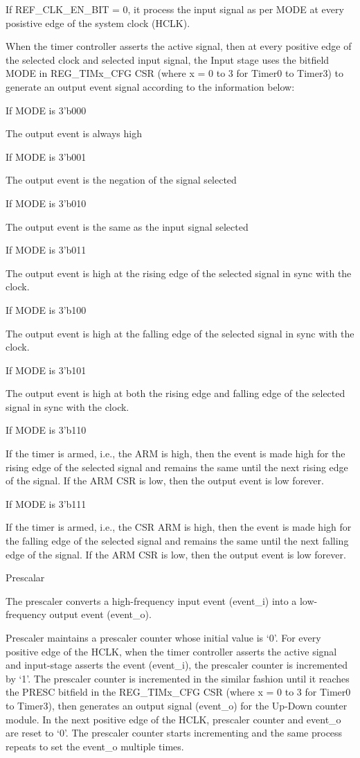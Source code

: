     If REF_CLK_EN_BIT = 0, it process the input signal as per MODE at every posistive edge of the system clock (HCLK).

When the timer controller asserts the active signal, then at every positive edge of the selected clock and selected input signal, the Input stage uses the bitfield MODE in REG_TIMx_CFG CSR (where x = 0 to 3 for Timer0 to Timer3) to generate an output event signal according to the information below:

    If MODE is 3’b000

        The output event is always high

    If MODE is 3’b001

        The output event is the negation of the signal selected

    If MODE is 3’b010

        The output event is the same as the input signal selected

    If MODE is 3’b011

        The output event is high at the rising edge of the selected signal in sync with the clock.

    If MODE is 3’b100

        The output event is high at the falling edge of the selected signal in sync with the clock.

    If MODE is 3’b101

        The output event is high at both the rising edge and falling edge of the selected signal in sync with the clock.

    If MODE is 3’b110

        If the timer is armed, i.e., the ARM is high, then the event is made high for the rising edge of the selected signal and remains the same until the next rising edge of the signal. If the ARM CSR is low, then the output event is low forever.

    If MODE is 3’b111

        If the timer is armed, i.e., the CSR ARM is high, then the event is made high for the falling edge of the selected signal and remains the same until the next falling edge of the signal. If the ARM CSR is low, then the output event is low forever.

Prescalar

The prescaler converts a high-frequency input event (event_i) into a low-frequency output event (event_o).

Prescaler maintains a prescaler counter whose initial value is ‘0’. For every positive edge of the HCLK, when the timer controller asserts the active signal and input-stage asserts the event (event_i), the prescaler counter is incremented by ‘1’. The prescaler counter is incremented in the similar fashion until it reaches the PRESC bitfield in the REG_TIMx_CFG CSR (where x = 0 to 3 for Timer0 to Timer3), then generates an output signal (event_o) for the Up-Down counter module. In the next positive edge of the HCLK, prescaler counter and event_o are reset to ‘0’. The prescaler counter starts incrementing and the same process repeats to set the event_o multiple times.

